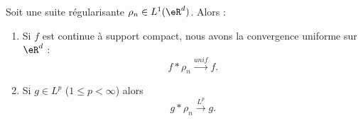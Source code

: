 \begin{proposition}       \label{PROPooYUVUooMiOktf}
	Soit une suite régularisante \( \rho_n\in L^1(\eR^d)\). Alors :
	\begin{enumerate}
		\item       \label{ITEMooLWMIooFFamdf}
		      Si \( f\) est continue à support compact, nous avons la convergence uniforme sur \( \eR^d\) :
		      \begin{equation}
			      f*\rho_n\stackrel{unif}{\longrightarrow} f.
		      \end{equation}
		\item       \label{ITEMooEJKKooChcgyM}
		      Si \( g\in L^p\) (\( 1\leq p<\infty\)) alors
		      \begin{equation}
			      g*\rho_n\stackrel{L^p}{\longrightarrow}g.
		      \end{equation}
	\end{enumerate}
\end{proposition}

